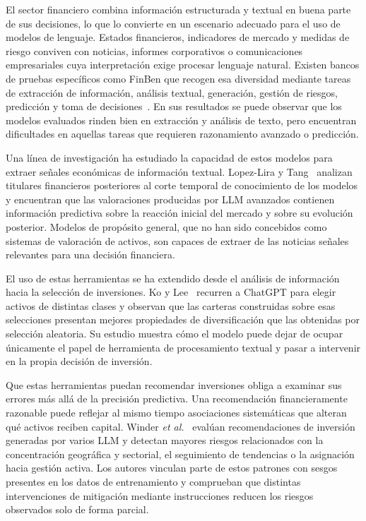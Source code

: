 El sector financiero combina información estructurada y textual en buena parte de sus decisiones, lo que lo convierte en un escenario adecuado para el uso de modelos de lenguaje. Estados financieros, indicadores de mercado y medidas de riesgo conviven con noticias, informes corporativos o comunicaciones empresariales cuya interpretación exige procesar lenguaje natural. Existen bancos de pruebas específicos como FinBen que recogen esa diversidad mediante tareas de extracción de información, análisis textual, generación, gestión de riesgos, predicción y toma de decisiones~\cite{xie2024finben}. En sus resultados se puede observar que los modelos evaluados rinden bien en extracción y análisis de texto, pero encuentran dificultades en aquellas tareas que requieren razonamiento avanzado o predicción. 

Una línea de investigación ha estudiado la capacidad de estos modelos para extraer señales económicas de información textual. Lopez-Lira y Tang~\cite{lopez2026can} analizan titulares financieros posteriores al corte temporal de conocimiento de los modelos y encuentran que las valoraciones producidas por LLM avanzados contienen información predictiva sobre la reacción inicial del mercado y sobre su evolución posterior. Modelos de propósito general, que no han sido concebidos como sistemas de valoración de activos, son capaces de extraer de las noticias señales relevantes para una decisión financiera.

El uso de estas herramientas se ha extendido desde el análisis de información hacia la selección de inversiones. Ko y Lee~\cite{ko2024can} recurren a ChatGPT para elegir activos de distintas clases y observan que las carteras construidas sobre esas selecciones presentan mejores propiedades de diversificación que las obtenidas por selección aleatoria. Su estudio muestra cómo el modelo puede dejar de ocupar únicamente el papel de herramienta de procesamiento textual y pasar a intervenir en la propia decisión de inversión.

Que estas herramientas puedan recomendar inversiones obliga a examinar sus errores más allá de la precisión predictiva. Una recomendación financieramente razonable puede reflejar al mismo tiempo asociaciones sistemáticas que alteran qué activos reciben capital. Winder \textit{et al.}~\cite{winder2025biased} evalúan recomendaciones de inversión generadas por varios LLM y detectan mayores riesgos relacionados con la concentración geográfica y sectorial, el seguimiento de tendencias o la asignación hacia gestión activa. Los autores vinculan parte de estos patrones con sesgos presentes en los datos de entrenamiento y comprueban que distintas intervenciones de mitigación mediante instrucciones reducen los riesgos observados solo de forma parcial.

